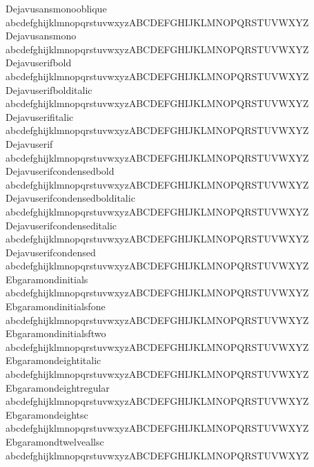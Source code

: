 \begin{tabbing}
Dejavusansmonooblique \> {\mktsFontfileDejavusansmonooblique{}abcdefghijklmnopqrstuvwxyzABCDEFGHIJKLMNOPQRSTUVWXYZ} \\
Dejavusansmono \> {\mktsFontfileDejavusansmono{}abcdefghijklmnopqrstuvwxyzABCDEFGHIJKLMNOPQRSTUVWXYZ} \\
Dejavuserifbold \> {\mktsFontfileDejavuserifbold{}abcdefghijklmnopqrstuvwxyzABCDEFGHIJKLMNOPQRSTUVWXYZ} \\
Dejavuserifbolditalic \> {\mktsFontfileDejavuserifbolditalic{}abcdefghijklmnopqrstuvwxyzABCDEFGHIJKLMNOPQRSTUVWXYZ} \\
Dejavuserifitalic \> {\mktsFontfileDejavuserifitalic{}abcdefghijklmnopqrstuvwxyzABCDEFGHIJKLMNOPQRSTUVWXYZ} \\
Dejavuserif \> {\mktsFontfileDejavuserif{}abcdefghijklmnopqrstuvwxyzABCDEFGHIJKLMNOPQRSTUVWXYZ} \\
Dejavuserifcondensedbold \> {\mktsFontfileDejavuserifcondensedbold{}abcdefghijklmnopqrstuvwxyzABCDEFGHIJKLMNOPQRSTUVWXYZ} \\
Dejavuserifcondensedbolditalic \> {\mktsFontfileDejavuserifcondensedbolditalic{}abcdefghijklmnopqrstuvwxyzABCDEFGHIJKLMNOPQRSTUVWXYZ} \\
Dejavuserifcondenseditalic \> {\mktsFontfileDejavuserifcondenseditalic{}abcdefghijklmnopqrstuvwxyzABCDEFGHIJKLMNOPQRSTUVWXYZ} \\
Dejavuserifcondensed \> {\mktsFontfileDejavuserifcondensed{}abcdefghijklmnopqrstuvwxyzABCDEFGHIJKLMNOPQRSTUVWXYZ} \\
Ebgaramondinitials \> {\mktsFontfileEbgaramondinitials{}abcdefghijklmnopqrstuvwxyzABCDEFGHIJKLMNOPQRSTUVWXYZ} \\
Ebgaramondinitialsfone \> {\mktsFontfileEbgaramondinitialsfone{}abcdefghijklmnopqrstuvwxyzABCDEFGHIJKLMNOPQRSTUVWXYZ} \\
Ebgaramondinitialsftwo \> {\mktsFontfileEbgaramondinitialsftwo{}abcdefghijklmnopqrstuvwxyzABCDEFGHIJKLMNOPQRSTUVWXYZ} \\
Ebgaramondeightitalic \> {\mktsFontfileEbgaramondeightitalic{}abcdefghijklmnopqrstuvwxyzABCDEFGHIJKLMNOPQRSTUVWXYZ} \\
Ebgaramondeightregular \> {\mktsFontfileEbgaramondeightregular{}abcdefghijklmnopqrstuvwxyzABCDEFGHIJKLMNOPQRSTUVWXYZ} \\
Ebgaramondeightsc \> {\mktsFontfileEbgaramondeightsc{}abcdefghijklmnopqrstuvwxyzABCDEFGHIJKLMNOPQRSTUVWXYZ} \\
Ebgaramondtwelveallsc \> {\mktsFontfileEbgaramondtwelveallsc{}abcdefghijklmnopqrstuvwxyzABCDEFGHIJKLMNOPQRSTUVWXYZ} \\

\end{tabbing}
